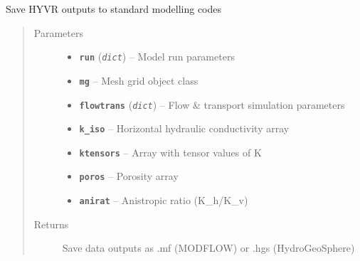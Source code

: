 \documentclass[letterpaper,10pt,english]{sphinxmanual}
\begin{document}

\begin{fulllineitems}
\label{hyvr:hyvr.hyvr.sim.save_models}
Save HYVR outputs to standard modelling codes
\begin{quote}\begin{description}
\item[{Parameters}] \leavevmode\begin{itemize}
\item {} 
\textbf{\texttt{run}} (\emph{\texttt{dict}}) -- Model run parameters

\item {} 
\textbf{\texttt{mg}} -- Mesh grid object class

\item {} 
\textbf{\texttt{flowtrans}} (\emph{\texttt{dict}}) -- Flow \& transport simulation parameters

\item {} 
\textbf{\texttt{k\_iso}} -- Horizontal hydraulic conductivity array

\item {} 
\textbf{\texttt{ktensors}} -- Array with tensor values of K

\item {} 
\textbf{\texttt{poros}} -- Porosity array

\item {} 
\textbf{\texttt{anirat}} -- Anistropic ratio (K\_h/K\_v)

\end{itemize}

\item[{Returns}] \leavevmode
Save data outputs as .mf (MODFLOW) or .hgs (HydroGeoSphere)

\end{description}\end{quote}

\end{fulllineitems}

\end{document}
